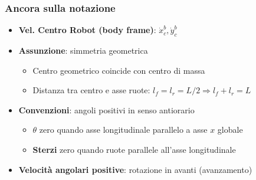 \begin{frame}
    \frametitle{Ancora sulla notazione}
    \begin{itemize}
        \item \textbf{Vel. Centro Robot (body frame)}: $\dot{x}_c^b, \dot{y}_c^b$
        \item \textbf{Assunzione}: simmetria geometrica
              \begin{itemize}
                  \item Centro geometrico coincide con centro di massa
                  \item Distanza tra centro e asse ruote: $l_f = l_r = L/2\Rightarrow l_f+l_r=L$
              \end{itemize}
        \item \textbf{Convenzioni}: angoli positivi in senso antiorario
              \begin{itemize}
                  \item \textbf{$\theta$} zero quando asse longitudinale parallelo a asse $x$ globale
                  \item \textbf{Sterzi} zero quando ruote parallele all'asse longitudinale
              \end{itemize}
        \item \textbf{Velocità angolari positive}: rotazione in avanti (avanzamento)
    \end{itemize}
\end{frame}
